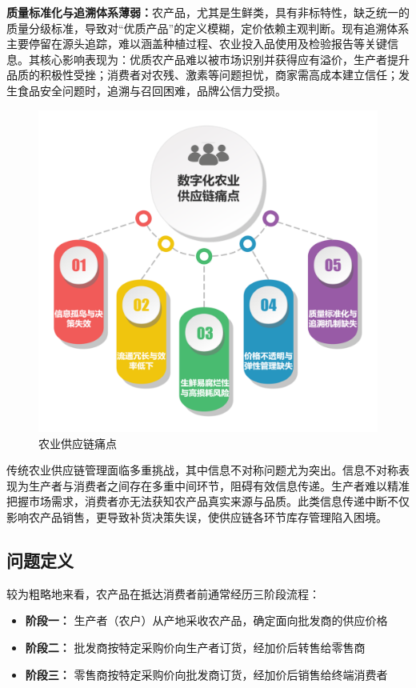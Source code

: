 \documentclass[lang=cn,12pt,a4paper]{elegantpaper}
\begin{document}
\textbf{质量标准化与追溯体系薄弱：}农产品，尤其是生鲜类，具有非标特性，缺乏统一的质量分级标准，导致对“优质产品”的定义模糊，定价依赖主观判断。现有追溯体系主要停留在源头追踪，难以涵盖种植过程、农业投入品使用及检验报告等关键信息。其核心影响表现为：优质农产品难以被市场识别并获得应有溢价，生产者提升品质的积极性受挫；消费者对农残、激素等问题担忧，商家需高成本建立信任；发生食品安全问题时，追溯与召回困难，品牌公信力受损。
\begin{figure}[H]
    \centering
    \includegraphics[width=1\linewidth]{痛点.pdf}
    \caption{农业供应链痛点}
    \label{fig:ex_tong}
\end{figure}
传统农业供应链管理面临多重挑战，其中信息不对称问题尤为突出。信息不对称表现为生产者与消费者之间存在多重中间环节，阻碍有效信息传递。生产者难以精准把握市场需求，消费者亦无法获知农产品真实来源与品质。此类信息传递中断不仅影响农产品销售，更导致补货决策失误，使供应链各环节库存管理陷入困境。

\subsection{问题定义}
\label{subsec:problem_definition}
较为粗略地来看，农产品在抵达消费者前通常经历三阶段流程\citep{lee2007coordination,zhao2023optimizing}：

\begin{itemize}
  \item \textbf{阶段一：} 生产者（农户）从产地采收农产品，确定面向批发商的供应价格
  \item \textbf{阶段二：} 批发商按特定采购价向生产者订货，经加价后转售给零售商
  \item \textbf{阶段三：} 零售商按特定采购价向批发商订货，经加价后销售给终端消费者
\end{itemize}
\end{document}
